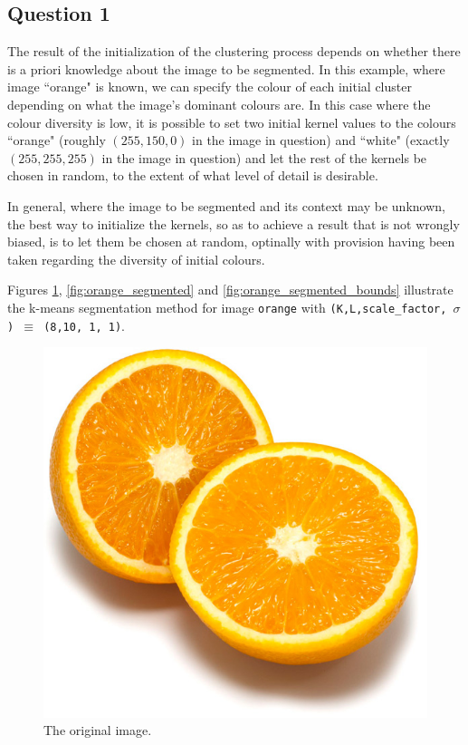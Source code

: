 \subsection{Question 1}

The result of the initialization of the clustering process depends on whether
there is a priori knowledge about the image to be segmented. In this example,
where image ``orange" is known, we can specify the colour of each initial
cluster depending on what the image's dominant colours are. In this case where
the colour diversity is low, it is possible to set two initial kernel values
to the colours ``orange" (roughly $(255,150,0)$ in the image in question)
and ``white" (exactly $(255,255,255)$ in the image in question)
and let the rest of the kernels be chosen in random,
to the extent of what level of detail is desirable.

In general, where the image to be segmented and its context may be unknown,
the best way to initialize the kernels, so as to achieve a result that is not
wrongly biased, is to let them be chosen at random, optinally with provision
having been taken regarding the diversity of initial colours.

Figures \ref{fig:orange}, \ref{fig:orange_segmented}
and \ref{fig:orange_segmented_bounds} illustrate the k-means segmentation
method for image \texttt{orange} with
\texttt{(K,L,scale\_factor, $\sigma$) $\equiv$ (8,10, 1, 1)}.


\begin{figure}[H]
	\centering
  \includegraphics[scale=0.4]{../../bildat_lab3/orange.jpg}
  \caption{The original image.}
  \label{fig:orange}
\end{figure}

